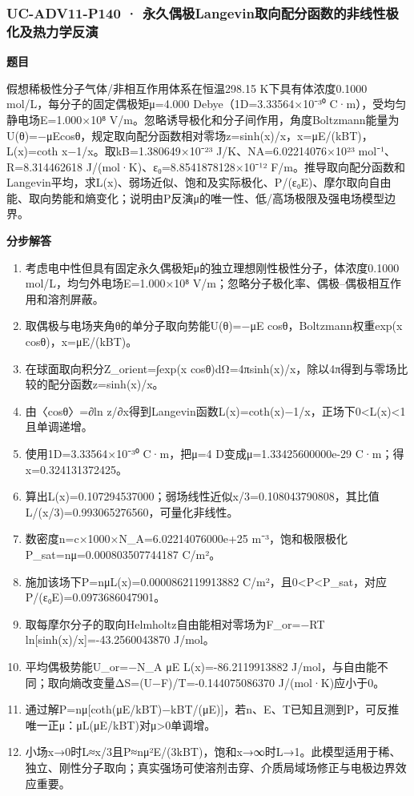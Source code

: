 \documentclass[UTF8,11pt,a4paper]{ctexart}
\begin{document}
\subsubsection*{UC-ADV11-P140 · 永久偶极Langevin取向配分函数的非线性极化及热力学反演}
\noindent\textbf{题目}\par
假想稀极性分子气体/非相互作用体系在恒温298.15 K下具有体浓度0.1000 mol/L，每分子的固定偶极矩μ=4.000 Debye（1D=3.33564×10⁻³⁰ C·m），受均匀静电场E=1.000×10⁸ V/m。忽略诱导极化和分子间作用，角度Boltzmann能量为U(θ)=−μEcosθ，规定取向配分函数相对零场z=sinh(x)/x，x=μE/(kBT)，L(x)=coth x−1/x。取kB=1.380649×10⁻²³ J/K、NA=6.02214076×10²³ mol⁻¹、R=8.314462618 J/(mol·K)、ε₀=8.8541878128×10⁻¹² F/m。推导取向配分函数和Langevin平均，求L(x)、弱场近似、饱和及实际极化、P/(ε₀E)、摩尔取向自由能、取向势能和熵变化；说明由P反演μ的唯一性、低/高场极限及强电场模型边界。\par
\medskip\noindent\textbf{分步解答}
\begin{enumerate}
\item 考虑电中性但具有固定永久偶极矩μ的独立理想刚性极性分子，体浓度0.1000 mol/L，均匀外电场E=1.000×10⁸ V/m；忽略分子极化率、偶极–偶极相互作用和溶剂屏蔽。
\item 取偶极与电场夹角θ的单分子取向势能U(θ)=−μE cosθ，Boltzmann权重exp(x cosθ)，x=μE/(kBT)。
\item 在球面取向积分Z\_orient=∫exp(x cosθ)dΩ=4πsinh(x)/x，除以4π得到与零场比较的配分函数z=sinh(x)/x。
\item 由〈cosθ〉=∂ln z/∂x得到Langevin函数L(x)=coth(x)−1/x，正场下0<L(x)<1且单调递增。
\item 使用1D=3.33564×10⁻³⁰ C·m，把μ=4 D变成μ=1.33425600000e-29 C·m；得x=0.324131372425。
\item 算出L(x)=0.107294537000；弱场线性近似x/3=0.108043790808，其比值L/(x/3)=0.993065276560，可量化非线性。
\item 数密度n=c×1000×N\_A=6.02214076000e+25 m⁻³，饱和极限极化P\_sat=nμ=0.000803507744187 C/m²。
\item 施加该场下P=nμL(x)=0.0000862119913882 C/m²，且0<P<P\_sat，对应P/(ε₀E)=0.0973686047901。
\item 取每摩尔分子的取向Helmholtz自由能相对零场为F\_or=−RT ln[sinh(x)/x]=-43.2560043870 J/mol。
\item 平均偶极势能U\_or=−N\_A μE L(x)=-86.2119913882 J/mol，与自由能不同；取向熵改变量ΔS=(U−F)/T=-0.144075086370 J/(mol·K)应小于0。
\item 通过解P=nμ[coth(μE/kBT)−kBT/(μE)]，若n、E、T已知且测到P，可反推唯一正μ：μL(μE/kBT)对μ>0单调增。
\item 小场x→0时L≈x/3且P≈nμ²E/(3kBT)，饱和x→∞时L→1。此模型适用于稀、独立、刚性分子取向；真实强场可使溶剂击穿、介质局域场修正与电极边界效应重要。
\end{enumerate}
\end{document}
